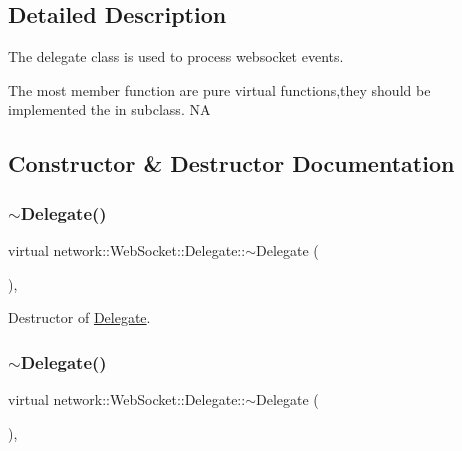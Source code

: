 \subsection{Detailed Description}
The delegate class is used to process websocket events.

The most member function are pure virtual functions,they should be implemented the in subclass.  NA 

\subsection{Constructor \& Destructor Documentation}
\mbox{\label{classnetwork_1_1WebSocket_1_1Delegate_acbed26b7e74c7ffff05ff481bfbb0c43}} 
\subsubsection{\texorpdfstring{$\sim$\+Delegate()}{~Delegate()}\hspace{0.1cm}{\footnotesize\ttfamily [1/2]}}
{\footnotesize\ttfamily virtual network\+::\+Web\+Socket\+::\+Delegate\+::$\sim$\+Delegate (\begin{DoxyParamCaption}{ }\end{DoxyParamCaption})\hspace{0.3cm}{\ttfamily [inline]}, {\ttfamily [virtual]}}

Destructor of \hyperlink{classnetwork_1_1WebSocket_1_1Delegate}{Delegate}. \mbox{\label{classnetwork_1_1WebSocket_1_1Delegate_acbed26b7e74c7ffff05ff481bfbb0c43}} 
\subsubsection{\texorpdfstring{$\sim$\+Delegate()}{~Delegate()}\hspace{0.1cm}{\footnotesize\ttfamily [2/2]}}
{\footnotesize\ttfamily virtual network\+::\+Web\+Socket\+::\+Delegate\+::$\sim$\+Delegate (\begin{DoxyParamCaption}{ }\end{DoxyParamCaption})\hspace{0.3cm}{\ttfamily [inline]}, {\ttfamily [virtual]}}

